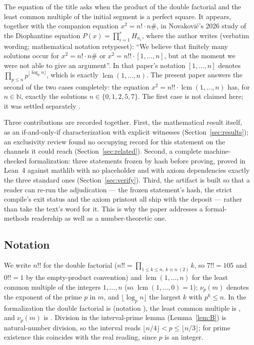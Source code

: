 \documentclass[11pt]{article}
\theoremstyle{definition}
\begin{document}
The equation of the title asks when the product of the double factorial and
the least common multiple of the initial segment is a perfect square. It
appears, together with the companion equation $x^2 = n! \cdot n\#$, in
Novakovi\'c's 2026 study \cite{novakovic2026} of the Diophantine equation
$P(x) = \prod_{i=1}^{r} H_{n_i}$, where the author writes (verbatim wording;
mathematical notation retypeset): ``We believe that finitely many solutions
occur for $x^2 = n! \cdot n\#$ or $x^2 = n!! \cdot [1, \ldots, n]$, but at the
moment we were not able to give an argument''. In that paper's notation
$[1, \ldots, n]$ denotes $\prod_{p \le n} p^{\lfloor \log_p n \rfloor}$,
which is exactly $\operatorname{lcm}(1,\dots,n)$. The present paper answers
the second of the two cases completely: the equation
$x^2 = n!! \cdot \operatorname{lcm}(1,\dots,n)$ has, for
$n \in \mathbb{N}$, exactly the solutions $n \in \{0,1,2,5,7\}$. The first
case is not claimed here; it was settled separately \cite{nfactpaper}.

Three contributions are recorded together. First, the mathematical result
itself, as an if-and-only-if characterization with explicit witnesses
(Section~\ref{sec:results}); an exclusivity review found no occupying record
for this statement on the channels it could reach
(Section~\ref{sec:related}). Second, a complete machine-checked formalization:
three statements frozen by hash before proving, proved in Lean~4 against
mathlib with no placeholder and with axiom dependencies exactly the three
standard ones (Section~\ref{sec:verify}). Third, the artifact is built so that
a reader can re-run the adjudication --- the frozen statement's hash, the
strict compile's exit status and the axiom printout all ship with the deposit
--- rather than take the text's word for it. This is why the paper addresses a
formal-methods readership as well as a number-theoretic one.

\subsection*{Notation}

We write $n!!$ for the double factorial ($n!! = \prod_{1 \le k \le n,\ k \equiv n \ (2)} k$,
so $7!! = 105$ and $0!! = 1$ by the empty-product convention) and
$\operatorname{lcm}(1,\dots,n)$ for the least common multiple of the integers
$1, \ldots, n$ (so $\operatorname{lcm}(1,\dots,0) = 1$); $\nu_p(m)$ denotes
the exponent of the prime $p$ in $m$, and $\lfloor \log_p n \rfloor$ the
largest $k$ with $p^k \le n$. In the formalization the double factorial is
 (notation ), the least common multiple is
, and $\nu_p(m)$ is . Division in
the interval-prime lemma (Lemma~\ref{lem:B}) is natural-number division, so
the interval reads $\lfloor n/4 \rfloor < p \le \lfloor n/3 \rfloor$; for
prime existence this coincides with the real reading, since $p$ is an integer.
\end{document}
